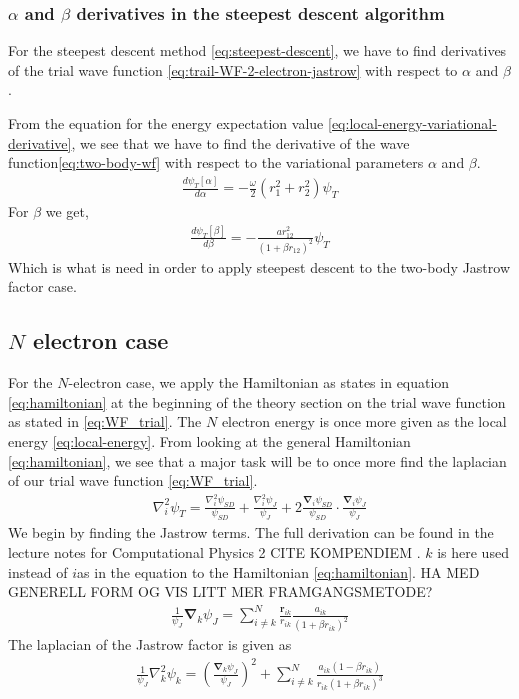 \documentclass[11pt]{article}
\newcommand{\husk}[1]{\color{red} #1 \color{black}}
\begin{document}
\subsubsection{\texorpdfstring{$\alpha$}{a} and \texorpdfstring{$\beta$}{b} derivatives in the steepest descent algorithm}
For the steepest descent method \eqref{eq:steepest-descent}, we have to find derivatives of the trial wave function \eqref{eq:trail-WF-2-electron-jastrow} with respect to $\alpha$ and $\beta$. 

From the equation for the energy expectation value \eqref{eq:local-energy-variational-derivative}, we see that we have to find the derivative of the wave function\eqref{eq:two-body-wf} with respect to the variational parameters $\alpha$ and $\beta$.
\begin{align}
	\frac{d\psi_T[\alpha]}{d\alpha} = -\frac{\omega}{2}(r_1^2 + r_2^2)\psi_T
	\label{eq:2body-alpha-derivative}
\end{align}
For $\beta$ we get,
\begin{align}
	\frac{d\psi_T[\beta]}{d\beta} = -\frac{a r_{12}^2}{(1+\beta r_{12})^2}\psi_T
	\label{eq:2body-beta-derivative}
\end{align}
Which is what is need in order to apply steepest descent to the two-body Jastrow factor case.

\subsection{\texorpdfstring{$N$}{N} electron case}
For the $N$-electron case, we apply the Hamiltonian as states in equation \eqref{eq:hamiltonian} at the beginning of the theory section on the trial wave function as stated in \eqref{eq:WF_trial}.
The $N$ electron energy is once more given as the local energy \eqref{eq:local-energy}. From looking at the general Hamiltonian \eqref{eq:hamiltonian}, we see that a major task will be to once more find the laplacian of our trial wave function \eqref{eq:WF_trial}.
\begin{align}
	\nabla_i^2\psi_T = \frac{\nabla^2_i\psi_{SD}}{\psi_{SD}} + \frac{\nabla^2_i\psi_J}{\psi_J} + 2\frac{\bm{\nabla}_i\psi_{SD}}{\psi_{SD}}\cdot\frac{\bm{\nabla}_i\psi_{J}}{\psi_J}
	\label{eq:laplacian-n-electron}
\end{align}
We begin by finding the Jastrow terms. The full derivation can be found in the lecture notes for Computational Physics 2 \husk{CITE KOMPENDIEM}. $k$ is here used instead of $i$as in the equation to the Hamiltonian \eqref{eq:hamiltonian}. \husk{HA MED GENERELL FORM OG VIS LITT MER FRAMGANGSMETODE?}
\begin{align}
	\frac{1}{\psi_J}\bm{\nabla}_k\psi_J = \sum_{i\neq k}^N \frac{\mathbf{r}_{ik}}{r_{ik}}\frac{a_{ik}}{(1+\beta r_{ik})^2}
	\label{eq:n-body-jastrow-grad}
\end{align}
The laplacian of the Jastrow factor is given as
\begin{align}
	\frac{1}{\psi_J}\nabla_k^2 \psi_k = \left( \frac{\bm{\nabla}_k \psi_J}{\psi_J} \right)^2 + \sum_{i\neq k}^N \frac{a_{ik}(1-\beta r_{ik})}{r_{ik}(1+\beta r_{ik})^3}
	\label{eq:n-body-jastrow-lap}
\end{align}
\end{document}
